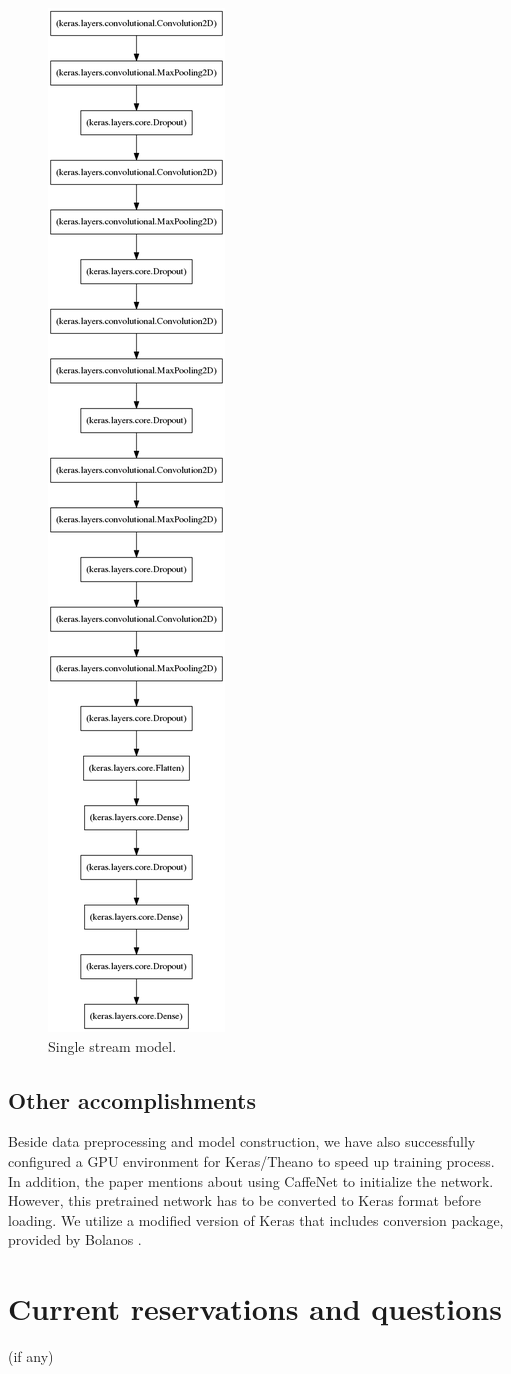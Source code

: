 \documentclass[paper=letter, fontsize=12pt]{article}
\begin{document}
\begin{figure}[htbp]
	\centering
	\includegraphics[width=.24\textwidth]{stream_model}
	\caption{Single stream model.}
	\label{fig:stream_model}
\end{figure}

\subsection{Other accomplishments}
Beside data preprocessing and model construction, we have also successfully configured a GPU environment for Keras/Theano to speed up training process. In addition, the paper mentions about using CaffeNet to initialize the network. However, this pretrained network has to be converted to Keras format before loading. We utilize a modified version of Keras that includes conversion package, provided by Bolanos \cite{Bolanos2016}.

\section{Current reservations and questions}
(if any)





\end{document}

